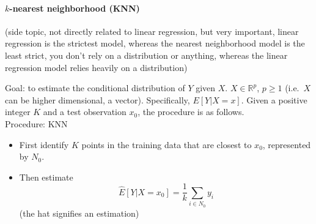 \documentclass[12 pt]{article}
\begin{document}
\paragraph{$k$-nearest neighborhood (KNN)} (side topic, not directly related
to linear regression, but very important, linear regression is the
strictest model, whereas the nearest neighborhood model is the least
strict, you don't rely on a distribution or anything, whereas the
linear regression model relies heavily on a distribution)

Goal: to estimate the conditional distribution of $Y$ given $X$. $X
\in \mathbb{R}^p$, $p \geq 1$ (i.e.\ $X$ can be higher dimensional, a
vector). Specifically, $E[Y | X = x]$. Given a positive integer $K$
and a test observation $x_0$, the procedure is as follows.
\\ Procedure: KNN
\begin{itemize}
\item First identify $K$ points in the training data that are closest
  to $x_0$, represented by $N_0$.
\item Then estimate $$\hat{E}[Y | X = x_0] = \frac{1}{k} \sum_{i \in N_0}y_i$$
  (the hat signifies an estimation)
\end{itemize}
\end{document}
